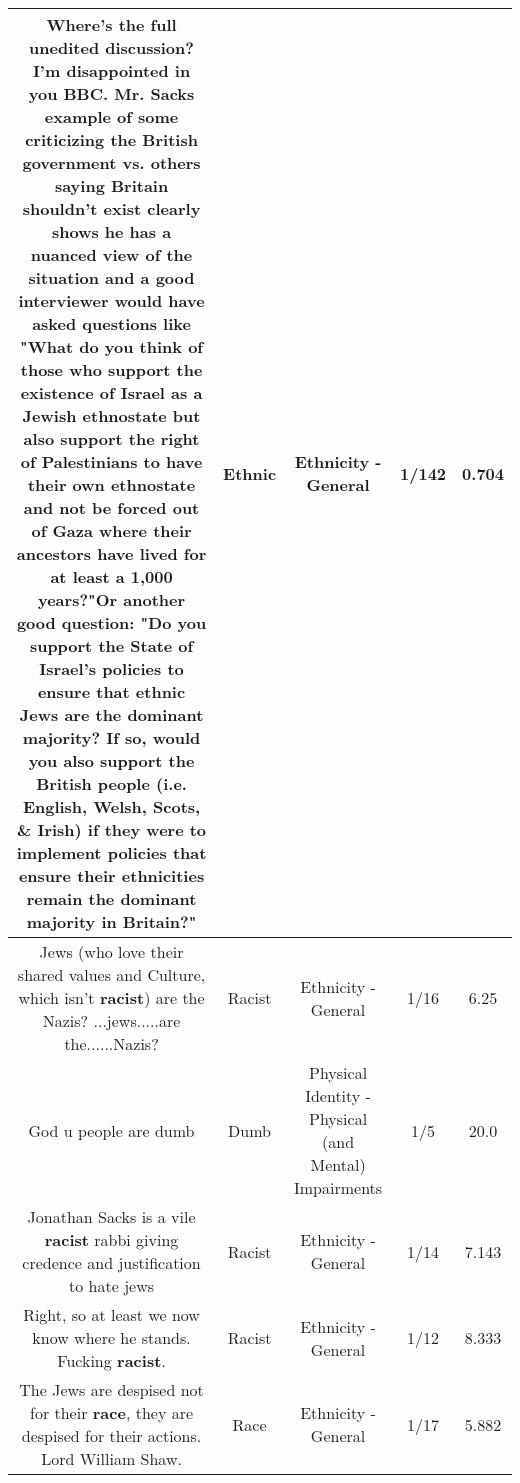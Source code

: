 \documentclass[11pt]{article}
\newlength\mylength
\begin{document}
\begin{center}
\begin{longtable}{|C{.65\mylength}|C{.30\mylength}|C{.12\mylength}|C{.12\mylength}|C{.12\mylength}|}
  \small Where's the full unedited discussion? I'm disappointed in you BBC. Mr. Sacks example of some criticizing the British government vs. others saying Britain shouldn't exist clearly shows he has a nuanced view of the situation and a good interviewer would have asked questions like "What do you think of those who support the existence of Israel as a Jewish ethnostate but also support the right of Palestinians to have their own ethnostate and not be forced out of Gaza where their ancestors have lived for at least a 1,000 years?"Or another good question: "Do you support the State of Israel's policies to ensure that \textbf{ethnic} Jews are the dominant majority? If so, would you also support the British people (i.e. English, Welsh, Scots, \& Irish) if they were to implement policies that ensure their ethnicities remain the dominant  majority in Britain?"\normalsize   & Ethnic & Ethnicity - General & 1/142 & 0.704 \\  \hline
  \small Jews (who love their shared values and Culture, which isn't \textbf{racist}) are the Nazis? ...jews.....are the......Nazis?\normalsize   & Racist & Ethnicity - General & 1/16 & 6.25 \\  \hline
  \small God u people are dumb\normalsize   & Dumb & Physical Identity - Physical (and Mental) Impairments & 1/5 & 20.0 \\  \hline
  \small Jonathan Sacks is a vile \textbf{racist} rabbi giving credence and justification to hate jews\normalsize   & Racist & Ethnicity - General & 1/14 & 7.143 \\  \hline
  \small Right, so at least we now know where he stands.  Fucking \textbf{racist}.\normalsize   & Racist & Ethnicity - General & 1/12 & 8.333 \\  \hline
  \small The Jews are despised not for their \textbf{race}, they are despised for their actions. Lord William Shaw.\normalsize   & Race & Ethnicity - General & 1/17 & 5.882 \\  \hline

\end{longtable}
\end{center}
\end{document}
